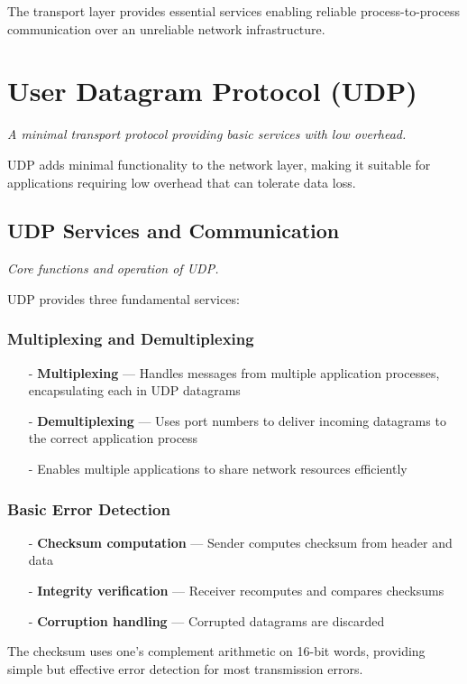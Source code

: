 \documentclass[../../compsys.tex]{subfiles}
\begin{document}
The transport layer provides essential services enabling reliable process-to-process communication over an unreliable network infrastructure.

\section{User Datagram Protocol (UDP)}
\textit{A minimal transport protocol providing basic services with low overhead.}

UDP adds minimal functionality to the network layer, making it suitable for applications requiring low overhead that can tolerate data loss.

\subsection{UDP Services and Communication}
\textit{Core functions and operation of UDP.}

UDP provides three fundamental services:

\subsubsection{Multiplexing and Demultiplexing}
\begin{itemize}
  \item[-] \textbf{Multiplexing} — Handles messages from multiple application processes, encapsulating each in UDP datagrams
  \item[-] \textbf{Demultiplexing} — Uses port numbers to deliver incoming datagrams to the correct application process
  \item[-] Enables multiple applications to share network resources efficiently
\end{itemize}

\subsubsection{Basic Error Detection}
\begin{itemize}
  \item[-] \textbf{Checksum computation} — Sender computes checksum from header and data
  \item[-] \textbf{Integrity verification} — Receiver recomputes and compares checksums
  \item[-] \textbf{Corruption handling} — Corrupted datagrams are discarded
\end{itemize}

The checksum uses one's complement arithmetic on 16-bit words, providing simple but effective error detection for most transmission errors.
\end{document}

